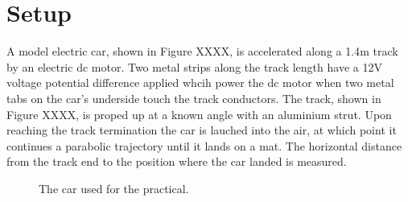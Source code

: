 \documentclass[a4paper]{article}
\begin{document}
\section{Setup}
A model electric car, shown in Figure XXXX, is accelerated along a 1.4$\si{\meter}$ track by an electric dc motor. Two metal strips along the track length have a 12$\si{\volt}$ voltage potential difference applied whcih power the dc motor when two metal tabs on the car's underside touch the track conductors. The track, shown in Figure XXXX, is proped up at a known angle with an aluminium strut. Upon reaching the track termination the car is lauched into the air, at which point it continues a parabolic trajectory until it lands on a mat. The horizontal distance from the track end to the position where the car landed is measured.
\begin{figure}[h]
	\begin{minipage}[t]{0.45\textwidth}
		\centering
		\caption{The car used for the practical.}
	\end{minipage}
	\hspace{1cm}
	\begin{minipage}[t]{0.45\textwidth}
		\centering

\end{minipage}
\end{figure}
\end{document}
